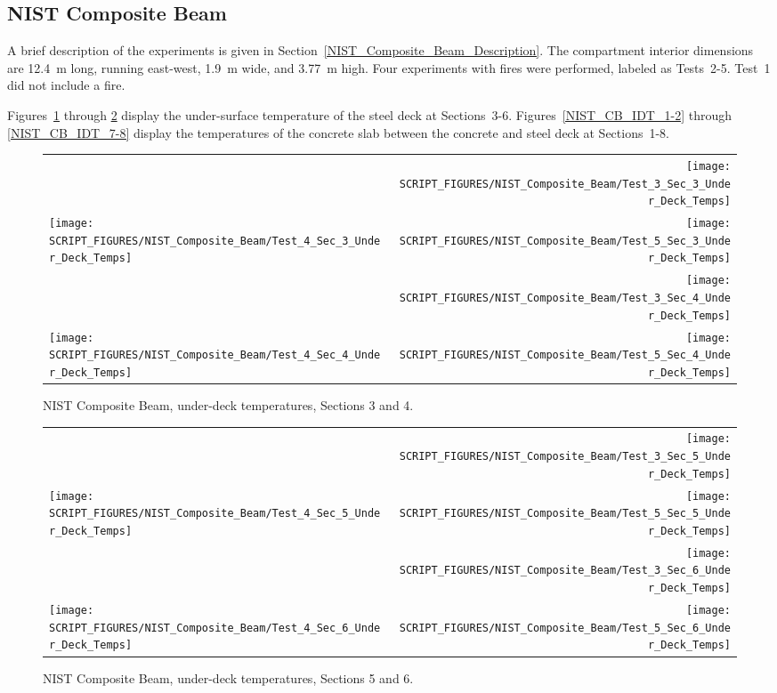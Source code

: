 \clearpage

\subsection{NIST Composite Beam}

A brief description of the experiments is given in Section~\ref{NIST_Composite_Beam_Description}. The compartment interior dimensions are 12.4~m long, running east-west, 1.9~m wide, and 3.77~m high. Four experiments with fires were performed, labeled as Tests~2-5. Test~1 did not include a fire.

Figures~\ref{NIST_CB_UDT_3-4} through \ref{NIST_CB_UDT_5-6} display the under-surface temperature of the steel deck at Sections~3-6. Figures~\ref{NIST_CB_IDT_1-2} through \ref{NIST_CB_IDT_7-8} display the temperatures of the concrete slab between the concrete and steel deck at Sections~1-8.

\newpage

\begin{figure}[p]
\begin{tabular*}{\textwidth}{l@{\extracolsep{\fill}}r}
 &
\texttt{[image: SCRIPT\_FIGURES/NIST\_Composite\_Beam/Test\_3\_Sec\_3\_Under\_Deck\_Temps]} \\
\texttt{[image: SCRIPT\_FIGURES/NIST\_Composite\_Beam/Test\_4\_Sec\_3\_Under\_Deck\_Temps]} &
\texttt{[image: SCRIPT\_FIGURES/NIST\_Composite\_Beam/Test\_5\_Sec\_3\_Under\_Deck\_Temps]} \\
 &
\texttt{[image: SCRIPT\_FIGURES/NIST\_Composite\_Beam/Test\_3\_Sec\_4\_Under\_Deck\_Temps]} \\
\texttt{[image: SCRIPT\_FIGURES/NIST\_Composite\_Beam/Test\_4\_Sec\_4\_Under\_Deck\_Temps]} &
\texttt{[image: SCRIPT\_FIGURES/NIST\_Composite\_Beam/Test\_5\_Sec\_4\_Under\_Deck\_Temps]}
\end{tabular*}
\caption[NIST Composite Beam, under-deck temperatures, Sections 3 and 4]{NIST Composite Beam, under-deck temperatures, Sections 3 and 4.}
\label{NIST_CB_UDT_3-4}
\end{figure}

\begin{figure}[p]
\begin{tabular*}{\textwidth}{l@{\extracolsep{\fill}}r}
 &
\texttt{[image: SCRIPT\_FIGURES/NIST\_Composite\_Beam/Test\_3\_Sec\_5\_Under\_Deck\_Temps]} \\
\texttt{[image: SCRIPT\_FIGURES/NIST\_Composite\_Beam/Test\_4\_Sec\_5\_Under\_Deck\_Temps]} &
\texttt{[image: SCRIPT\_FIGURES/NIST\_Composite\_Beam/Test\_5\_Sec\_5\_Under\_Deck\_Temps]} \\
 &
\texttt{[image: SCRIPT\_FIGURES/NIST\_Composite\_Beam/Test\_3\_Sec\_6\_Under\_Deck\_Temps]} \\
\texttt{[image: SCRIPT\_FIGURES/NIST\_Composite\_Beam/Test\_4\_Sec\_6\_Under\_Deck\_Temps]} &
\texttt{[image: SCRIPT\_FIGURES/NIST\_Composite\_Beam/Test\_5\_Sec\_6\_Under\_Deck\_Temps]}
\end{tabular*}
\caption[NIST Composite Beam, under-deck temperatures, Sections 5 and 6]{NIST Composite Beam, under-deck temperatures, Sections 5 and 6.}
\label{NIST_CB_UDT_5-6}
\end{figure}

